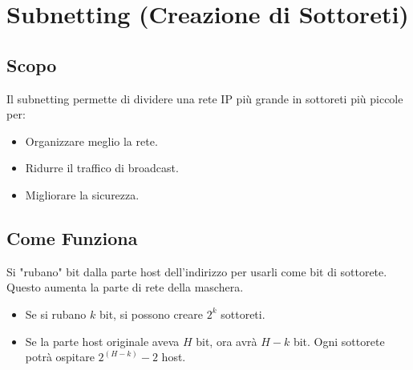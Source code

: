 \section{Subnetting (Creazione di Sottoreti)}

\subsection{Scopo}
Il subnetting permette di dividere una rete IP più grande in sottoreti più piccole per:
\begin{itemize}
    \item Organizzare meglio la rete.
    \item Ridurre il traffico di broadcast.
    \item Migliorare la sicurezza.
\end{itemize}

\subsection{Come Funziona}
Si "rubano" bit dalla parte host dell'indirizzo per usarli come bit di sottorete. Questo aumenta la parte di rete della maschera.
\begin{itemize}
    \item Se si rubano $k$ bit, si possono creare $2^k$ sottoreti.
    \item Se la parte host originale aveva $H$ bit, ora avrà $H-k$ bit. Ogni sottorete potrà ospitare $2^{(H-k)} - 2$ host.
\end{itemize}

